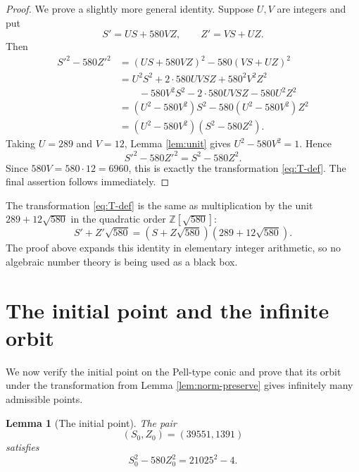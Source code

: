 \documentclass[11pt]{article}
\numberwithin{equation}{section}
\newtheorem{lemma}[theorem]{Lemma}
\newcommand{\Z}{\mathbb Z}
\begin{document}
\begin{proof}
We prove a slightly more general identity. Suppose $U,V$ are integers and put
\begin{equation*}
        S'=US+580VZ,
        \qquad
        Z'=VS+UZ.
\end{equation*}
Then
\begin{align*}
        S'^2-580Z'^2
        &=(US+580VZ)^2-580(VS+UZ)^2\\
        &=U^2S^2+2\cdot 580UVSZ+580^2V^2Z^2\\
        &\qquad{}-580V^2S^2-2\cdot 580UVSZ-580U^2Z^2\\
        &=(U^2-580V^2)S^2-580(U^2-580V^2)Z^2\\
        &=(U^2-580V^2)(S^2-580Z^2).
\end{align*}
Taking $U=289$ and $V=12$, Lemma \ref{lem:unit} gives
$U^2-580V^2=1$. Hence
\begin{equation*}
        S'^2-580Z'^2=S^2-580Z^2.
\end{equation*}
Since $580V=580\cdot 12=6960$, this is exactly the transformation
\eqref{eq:T-def}. The final assertion follows immediately.
\end{proof}

The transformation \eqref{eq:T-def} is the same as multiplication by the unit
$289+12\sqrt{580}$ in the quadratic order $\Z[\sqrt{580}]$:
\begin{equation*}
        S'+Z'\sqrt{580}
        =(S+Z\sqrt{580})(289+12\sqrt{580}).
\end{equation*}
The proof above expands this identity in elementary integer arithmetic, so no
algebraic number theory is being used as a black box.

\section{The initial point and the infinite orbit}

We now verify the initial point on the Pell-type conic and prove that its orbit
under the transformation from Lemma \ref{lem:norm-preserve} gives infinitely
many admissible points.

\begin{lemma}[The initial point]\label{lem:initial-point}
The pair
\begin{equation*}
        (S_0,Z_0)=(39551,1391)
\end{equation*}
satisfies
\begin{equation}\label{eq:initial-solves}
        S_0^2-580Z_0^2=21025^2-4.
\end{equation}
\end{lemma}
\end{document}
